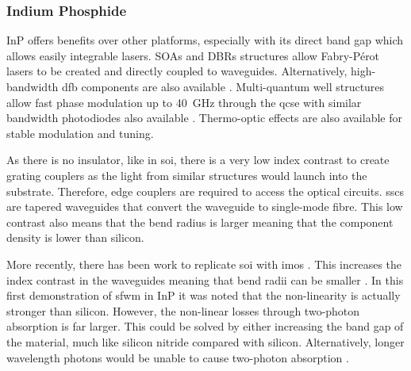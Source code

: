
\subsubsection*{Indium Phosphide}

\Ac{InP} offers benefits over other platforms, especially with its direct band gap which allows easily integrable lasers. \Acp{SOA} and \acp{DBR} structures allow Fabry-P\'{e}rot lasers to be created and directly coupled to waveguides. Alternatively, high-bandwidth \ac{dfb} components are also available \cite{smit2014, jeppix}. Multi-quantum well structures allow fast phase modulation up to \SI{40}{GHz} through the \ac{qcse} with similar bandwidth photodiodes also available \cite{smit2014}. Thermo-optic effects are also available for stable modulation and tuning.

As there is no insulator, like in \ac{soi}, there is a very low index contrast to create grating couplers as the light from similar structures would launch into the substrate. Therefore, edge couplers are required to access the optical circuits. \Acp{ssc} are tapered waveguides that convert the waveguide to single-mode fibre. This low contrast also means that the bend radius is larger meaning that the component density is lower than silicon.

More recently, there has been work to replicate \ac{soi} with \ac{imos} \cite{IMOS, van2011photonic}. This increases the index contrast in the waveguides meaning that bend radii can be smaller \cite{Kumar2019}. In this first demonstration of \ac{sfwm} in \ac{InP} it was noted that the non-linearity is actually stronger than silicon. However, the non-linear losses through two-photon absorption is far larger. This could be solved by either increasing the band gap of the material, much like silicon nitride compared with silicon. Alternatively, longer wavelength photons would be unable to cause two-photon absorption \cite{rosenfeld2019mid}. 





